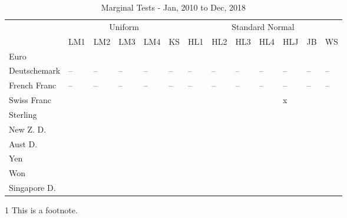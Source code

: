 \documentclass[12pt]{article}
\begin{document}
\begin{table}
	\caption{Marginal Tests - Jan, 2010 to Dec, 2018}
	\begin{threeparttable}
		\begin{tabular}[l]{l l l l l l l l l l l l l}
	    \hline
	& \multicolumn{5}{c}{Uniform}  & \multicolumn{7}{c}{Standard Normal} \\
			            & LM1        & LM2        & LM3        & LM4        & KS         & HL1        & HL2        & HL3        & HL4        & HLJ        & JB         & WS \\
	\hline
	    Euro            & \checkplus & \checkplus & \checkplus & \checkplus & \checkplus & \checkplus & \checkplus & \checkplus & \checkplus & \checkplus & \checkplus & \checkplus \\
		Deutschemark    & --  & --  & --  & --  & -- & --  & --  & --  & --  & --  & -- & -- \\
		French Franc    & --  & --  & --  & --  & -- & --  & --  & --  & --  & --  & -- & -- \\
		Swiss Franc     & \checkplus & \checkplus & \checkplus & \checkplus & \checkplus & \checkplus & \checkplus & \checkplus & \checkplus & x          & \checkplus & \checkplus \\
		Sterling        & \checkmark & \checkplus & \checkplus & \checkplus & \checkplus & \checkplus & \checkplus & \checkplus & \checkplus & \checkplus & \checkplus & \checkplus \\
		New Z. D.       & \checkplus & \checkplus & \checkplus & \checkplus & \checkplus & \checkplus & \checkplus & \checkplus & \checkplus & \checkplus & \checkplus & \checkplus \\
		Aust D.         & \checkplus & \checkplus & \checkplus & \checkplus & \checkplus & \checkplus & \checkplus & \checkplus & \checkplus & \checkplus & \checkplus & \checkplus \\
		Yen             & \checkplus & \checkplus & \checkplus & \checkplus & \checkplus & \checkplus & \checkplus & \checkplus & \checkplus & \checkplus & \checkplus & \checkplus \\
		Won             & \checkplus & \checkplus & \checkplus & \checkplus & \checkplus & \checkplus & \checkplus & \checkplus & \checkplus & \checkplus & \checkplus & \checkplus \\
		Singapore D.    & \checkplus & \checkplus & \checkplus & \checkplus & \checkplus & \checkplus & \checkplus & \checkplus & \checkplus & \checkplus & \checkplus & \checkplus \\
	\hline
		\end{tabular}
		\begin{tablenotes}
			\item[1]{\footnotesize This is a footnote.}
		\end{tablenotes}
	\end{threeparttable}
\end{table}
\end{document}
